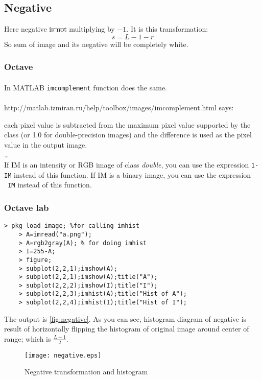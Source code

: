 \subsection{Negative}
Here negative \st{is not} multiplying by $-1$. It is this transformation:
\[s=L-1-r\]
So sum of image and its negative will be completely white.

\subsubsection{Octave}

\paragraph*{}In MATLAB \texttt{imcomplement} function does the same.
\paragraph*{}http://matlab.izmiran.ru/help/toolbox/images/imcomplement.html says:

\begin{displayquote}
    each pixel value is subtracted from the maximum pixel value supported by the
    class (or 1.0 for double-precision images) and the difference is used as the
    pixel value in the output image.\\
    \dots\\
    If IM is an intensity or RGB image of class \emph{double}, you can use the expression \texttt{1-IM} instead of this function. If IM is a binary image, you can use the expression \texttt{~IM} instead of this function.
\end{displayquote}

\subsubsection{Octave lab}
\begin{Verbatim}[frame=single,label=negative,vspace=0pt]
    > pkg load image; %for calling imhist
    > A=imread("a.png");
    > A=rgb2gray(A); % for doing imhist
    > I=255-A;
    > figure;
    > subplot(2,2,1);imshow(A);
    > subplot(2,2,1);imshow(A);title("A");
    > subplot(2,2,2);imshow(I);title("I");
    > subplot(2,2,3);imhist(A);title("Hist of A");
    > subplot(2,2,4);imhist(I);title("Hist of I");
\end{Verbatim}  
The output is \autoref{fig:negative}. As you can see, histogram
diagram of negative is result of horizontally flipping the histogram of original
image around center of range; which is $\frac{L-1}{2}$. 
\begin{figure}[htb!]
\texttt{[image: negative.eps]}
\centering
\caption{Negative transformation and histogram}
\label{fig:negative}
\end{figure}

\clearpage
        

        
